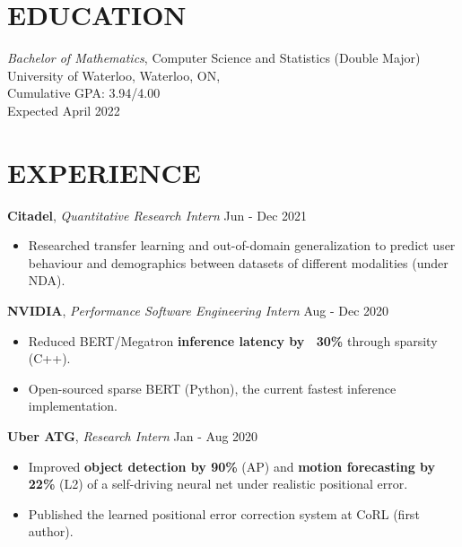 \documentclass[line,margin]{res}
\newcommand{\experience}[3]{\textbf{#1}, \textit{#2} \hfill #3 \\ \vspace{-4mm}}
\begin{document}
\address{
    (647) 643-4450 $\cdot$
    \href{mailto:nbvadive@uwaterloo.ca}{nbvadive@uwaterloo.ca} $\cdot$
    \href{https://nicholasvadivelu.com/}{nicholasvadivelu.com}
}

\begin{resume}
\vspace{-4mm}

\section{EDUCATION}
    \textit{Bachelor of Mathematics}, Computer Science and Statistics (Double Major) \\
    University of Waterloo, Waterloo, ON, \\
    Cumulative GPA: 3.94/4.00 \\
    Expected April 2022


\section{EXPERIENCE}
    \experience{Citadel}{Quantitative Research Intern}{Jun - Dec 2021}
    \begin{itemize}
        \item Researched transfer learning and out-of-domain generalization to predict user behaviour and demographics between datasets of different modalities (under NDA).
    \end{itemize}

    \experience{NVIDIA}{Performance Software Engineering Intern}{Aug - Dec 2020}
    \begin{itemize}
        \item Reduced BERT/Megatron \textbf{inference latency by ~30\%} through sparsity (C++).
        \item Open-sourced sparse BERT (Python), the current fastest inference implementation.
    \end{itemize}

    \experience{Uber ATG}{Research Intern}{Jan - Aug 2020}
    \begin{itemize}
        \item Improved \textbf{object detection by 90\%} (AP) and \textbf{motion forecasting by 22\%} (L2) of a self-driving neural net under realistic positional error.
        \item Published the learned positional error correction system at CoRL (first author).
    \end{itemize}


\end{resume}
\end{document}
